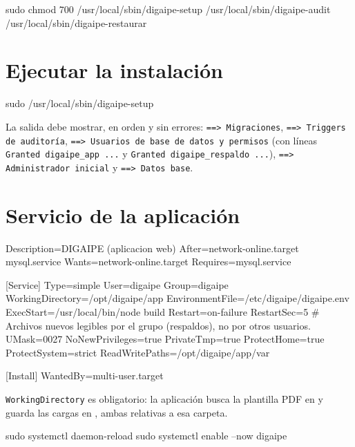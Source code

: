 \begin{codigo}
sudo chmod 700 /usr/local/sbin/digaipe-setup /usr/local/sbin/digaipe-audit /usr/local/sbin/digaipe-restaurar
\end{codigo}

\section{Ejecutar la instalación}

\begin{codigo}
sudo /usr/local/sbin/digaipe-setup
\end{codigo}

\begin{comprobar}
	La salida debe mostrar, en orden y sin errores: \texttt{==> Migraciones},
	\texttt{==> Triggers de auditoría}, \texttt{==> Usuarios de base de datos y permisos}
	(con líneas \texttt{Granted digaipe\_app ...} y \texttt{Granted digaipe\_respaldo ...}),
	\texttt{==> Administrador inicial} y \texttt{==> Datos base}.
\end{comprobar}

\section{Servicio de la aplicación}

\begin{codigo}[label={/etc/systemd/system/digaipe.service}]
[Unit]
Description=DIGAIPE (aplicacion web)
After=network-online.target mysql.service
Wants=network-online.target
Requires=mysql.service

[Service]
Type=simple
User=digaipe
Group=digaipe
WorkingDirectory=/opt/digaipe/app
EnvironmentFile=/etc/digaipe/digaipe.env
ExecStart=/usr/local/bin/node build
Restart=on-failure
RestartSec=5
# Archivos nuevos legibles por el grupo (respaldos), no por otros usuarios.
UMask=0027
NoNewPrivileges=true
PrivateTmp=true
ProtectHome=true
ProtectSystem=strict
ReadWritePaths=/opt/digaipe/app/var

[Install]
WantedBy=multi-user.target
\end{codigo}

\texttt{WorkingDirectory} es obligatorio: la aplicación busca la plantilla PDF en
 y guarda las cargas en , ambas relativas a esa carpeta.

\begin{codigo}
sudo systemctl daemon-reload
sudo systemctl enable --now digaipe
\end{codigo}

